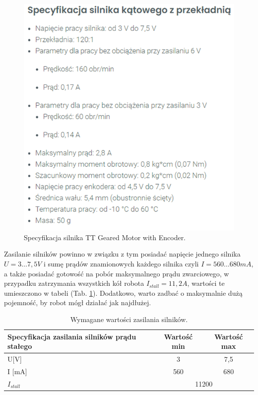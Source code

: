 \documentclass{report}
\begin{document}
\begin{figure}[H]
    \centering
    \includegraphics{src/tech_specifications/TT Geared Motor with Encoder.png}
    \caption{Specyfikacja silnika TT Geared Motor with Encoder. \cite{MotorEngine}}
    \label{fig:motor-spec}
\end{figure}

Zasilanie silników powinno w związku z tym posiadać napięcie jednego silnika $U=3\ldots7,5 V$ i sumę 
prądów znamionowych każdego silnika czyli $I=560\ldots680 mA$, a także posiadać gotowość na pobór 
maksymalnego prądu zwarciowego, w przypadku zatrzymania wszystkich kół robota $I_{stall}=11,2 A$, 
wartości te umieszczono w tabeli (Tab. \ref{tab:motors-power}). Dodatkowo, warto zadbać o maksymalnie dużą pojemność, by robot mógł działać jak najdłużej.


\begin{table}[H]
\centering
    \begin{tabular}{|m{10em}|cc|}
    \hline
    Specyfikacja zasilania silników prądu stałego & \multicolumn{1}{c|}{Wartość min} & Wartość max \\ \hline
    U{[}V{]}                                      & \multicolumn{1}{c|}{3}           & 7,5         \\ \hline
    I {[}mA{]}                                    & \multicolumn{1}{c|}{560}         & 680         \\ \hline
    $I_{stall}$                                   & \multicolumn{2}{c|}{11200}                     \\ \hline
    \end{tabular}
    \caption{Wymagane wartości zasilania silników.}
    \label{tab:motors-power}
\end{table}
\end{document}
